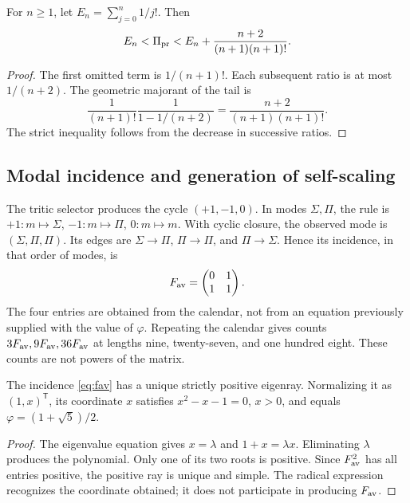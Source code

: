 \begin{proposition}
For \(n\ge1\), let \(E_n=\sum_{j=0}^n1/j!\). Then
\[
 E_n<\Pi_{\rm pr}<E_n+\frac{n+2}{(n+1)(n+1)!}.
\]
\end{proposition}
\begin{proof}
The first omitted term is \(1/(n+1)!\). Each subsequent ratio is at most \(1/(n+2)\). The geometric majorant of the tail is
\[
 \frac1{(n+1)!}\frac1{1-1/(n+2)}
 =\frac{n+2}{(n+1)(n+1)!}.
\]
The strict inequality follows from the decrease in successive ratios.
\end{proof}

\subsection{Modal incidence and generation of self-scaling}

The tritic selector produces the cycle \((+1,-1,0)\). In modes \(\Sigma,\Pi\), the rule is \(+1:m\mapsto\Sigma\), \(-1:m\mapsto\Pi\), \(0:m\mapsto m\). With cyclic closure, the observed mode is \((\Sigma,\Pi,\Pi)\). Its edges are \(\Sigma\to\Pi\), \(\Pi\to\Pi\), and \(\Pi\to\Sigma\). Hence its incidence, in that order of modes, is
\begin{equation}
 F_{\rm av}=\begin{pmatrix}0&1\\1&1\end{pmatrix}.
 \label{eq:fav}
\end{equation}
The four entries are obtained from the calendar, not from an equation previously supplied with the value of \(\varphi\). Repeating the calendar gives counts \(3F_{\rm av},9F_{\rm av},36F_{\rm av}\) at lengths nine, twenty-seven, and one hundred eight. These counts are not powers of the matrix.

\begin{theorem}
The incidence \eqref{eq:fav} has a unique strictly positive eigenray. Normalizing it as \((1,x)^{\mathsf T}\), its coordinate \(x\) satisfies \(x^2-x-1=0\), \(x>0\), and equals \(\varphi=(1+\sqrt5)/2\).
\end{theorem}
\begin{proof}
The eigenvalue equation gives \(x=\lambda\) and \(1+x=\lambda x\). Eliminating \(\lambda\) produces the polynomial. Only one of its two roots is positive. Since \(F_{\rm av}^2\) has all entries positive, the positive ray is unique and simple. The radical expression recognizes the coordinate obtained; it does not participate in producing \(F_{\rm av}\).
\end{proof}

